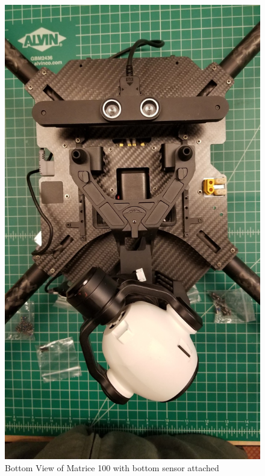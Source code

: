 \begin{figure}
\begin{center}
\includegraphics[width=0.8\columnwidth]{figures/hovering4.png}
\end{center}
\caption{Bottom View of Matrice 100 with bottom sensor attached}
\label{fig:hovering4}
\end{figure}

